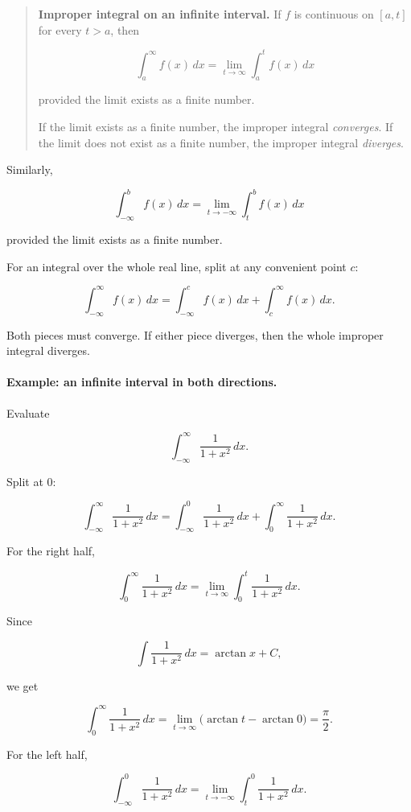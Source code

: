 \begin{quote}
\textbf{Improper integral on an infinite interval.}
If \(f\) is continuous on \([a,t]\) for every \(t>a\), then

\[
\boxed{
\int_a^\infty f(x)\,dx
=
\lim_{t\to\infty}\int_a^t f(x)\,dx
}
\]

provided the limit exists as a finite number.

If the limit exists as a finite number, the improper integral \emph{converges}.  If the
limit does not exist as a finite number, the improper integral \emph{diverges}.
\end{quote}

Similarly,

\[
\boxed{
\int_{-\infty}^b f(x)\,dx
=
\lim_{t\to-\infty}\int_t^b f(x)\,dx
}
\]

provided the limit exists as a finite number.

For an integral over the whole real line, split at any convenient point \(c\):

\[
\boxed{
\int_{-\infty}^{\infty} f(x)\,dx
=
\int_{-\infty}^{c} f(x)\,dx
+
\int_c^{\infty} f(x)\,dx.
}
\]

Both pieces must converge.  If either piece diverges, then the whole improper integral
diverges.

\paragraph{Example: an infinite interval in both directions.}
Evaluate

\[
\int_{-\infty}^{\infty} \frac{1}{1+x^2}\,dx.
\]

Split at \(0\):

\[
\int_{-\infty}^{\infty} \frac{1}{1+x^2}\,dx
=
\int_{-\infty}^{0} \frac{1}{1+x^2}\,dx
+
\int_0^{\infty} \frac{1}{1+x^2}\,dx.
\]

For the right half,

\[
\int_0^\infty \frac{1}{1+x^2}\,dx
=
\lim_{t\to\infty}\int_0^t \frac{1}{1+x^2}\,dx.
\]

Since

\[
\int \frac{1}{1+x^2}\,dx=\arctan x+C,
\]

we get

\[
\int_0^\infty \frac{1}{1+x^2}\,dx
=
\lim_{t\to\infty}\bigl(\arctan t-\arctan 0\bigr)
=
\frac{\pi}{2}.
\]

For the left half,

\[
\int_{-\infty}^0 \frac{1}{1+x^2}\,dx
=
\lim_{t\to-\infty}\int_t^0 \frac{1}{1+x^2}\,dx.
\]

